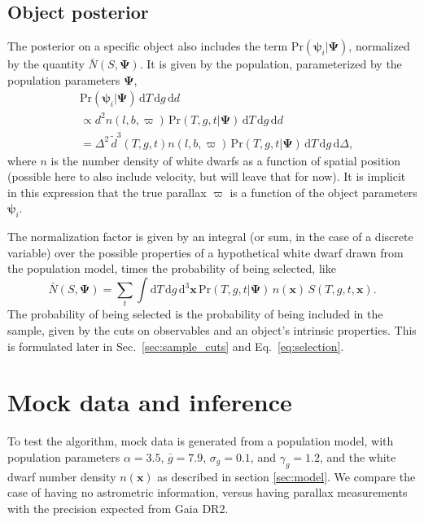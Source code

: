 \documentclass[fleqn,usenatbib]{mnras}
\newcommand{\popp}{\boldsymbol{\Psi}}
\newcommand{\objp}{\boldsymbol{\psi}}
\newcommand{\Teff}{T}
\newcommand{\logg}{g}
\newcommand{\pr}{\text{Pr}}
\newcommand{\de}{\text{d}}
\begin{document}
\subsection{Object posterior}\label{sec:objectposterior}

The posterior on a specific object also includes the term $\pr(\objp_i | \popp)$, normalized by the quantity $\bar{N}(S,\popp)$. It is given by the population, parameterized by the population parameters $\popp$,
\begin{equation}
\begin{split}
	& \pr(\objp_i | \popp)\, \de \Teff\, \de \logg\, \de d  \\ & \propto
    d^2 n(l,b,\varpi)\, \pr(\Teff,g,t | \popp)\, \de \Teff\, \de \logg\, \de d \\
    & = \Delta^2\, \tilde{d}^3(\Teff,\logg,t) n(l,b,\varpi)\, \pr(\Teff,g,t | \popp)\, \de \Teff\, \de\logg\, \de \Delta,
\end{split}
\end{equation}
where $n$ is the number density of white dwarfs as a function of spatial position (possible here to also include velocity, but will leave that for now). It is implicit in this expression that the true parallax $\varpi$ is a function of the object parameters $\objp_i$.

The normalization factor is given by an integral (or sum, in the case of a discrete variable) over the possible properties of a hypothetical white dwarf drawn from the population model, times the probability of being selected, like
\begin{equation}\label{eq:normalization}
	\bar{N}(S,\popp) = \sum_{t} \int \de\Teff\, \de \logg\, \de^3\mathbf{x}\,
    \pr(\Teff,g,t | \popp)\, n(\mathbf{x})\, S(\Teff,\logg,t,\mathbf{x}).
\end{equation}
The probability of being selected is the probability of being included in the sample, given by the cuts on observables and an object's intrinsic properties. This is formulated later in Sec.~\ref{sec:sample_cuts} and Eq.~\eqref{eq:selection}.



\section{Mock data and inference}\label{sec:mock}

To test the algorithm, mock data is generated from a population model, with population parameters $\alpha=3.5$, $\bar{g}=7.9$, $\sigma_g=0.1$, and $\gamma_g=1.2$, and the white dwarf number density $n(\mathbf{x})$ as described in section \ref{sec:model}. We compare the case of having no astrometric information, versus having parallax measurements with the precision expected from Gaia DR2.
\end{document}
